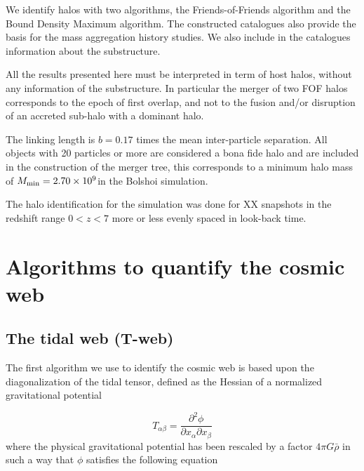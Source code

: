 \documentclass[a4,useAMS,usenatbib,usegraphicx]{latex/mn2e}
\begin{document}
We identify halos with two algorithms, the Friends-of-Friends  algorithm and the Bound Density Maximum algorithm. The 
constructed catalogues also provide the basis for the mass aggregation 
history studies. We also include in the catalogues information about the 
substructure.



All the results presented here must be interpreted in term of host halos, 
without any information of the substructure. In particular the merger of 
two FOF halos corresponds to the epoch of first overlap, and not to the 
fusion and/or disruption of an accreted sub-halo with a dominant halo. 



The linking length is $b=0.17$ times the mean inter-particle separation. 
All objects with 20 particles or more are considered a bona fide halo and 
are included in the construction of the merger tree, this corresponds to a 
minimum halo mass of $M_{\rm min}=2.70\times 10^{9}$\hMsun in the Bolshoi 
simulation.



The halo identification for the simulation was done for XX snapshots in 
the redshift range $0<z<7$ more or less evenly spaced in look-back time.



\section{Algorithms to quantify the cosmic web}
\label{sec:algorithms_cosmic_web}



\subsection{The tidal web (T-web)}
\label{subsec:Tweb}



The first algorithm  we use to identify the cosmic web is based upon the
diagonalization of the tidal tensor, defined as the Hessian of a 
normalized gravitational potential  


\begin{equation}
T_{\alpha\beta} = \frac{\partial^2\phi}{\partial x_{\alpha}\partial x_{\beta}}
\end{equation}
where the physical gravitational potential has been rescaled by a factor 
$4\pi G\bar{\rho}$ in such a way that $\phi$ satisfies the following 
equation
\end{document}
